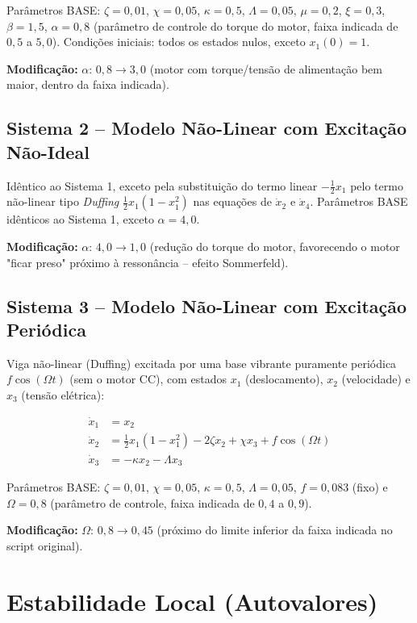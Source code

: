 \documentclass[a4paper,11pt]{article}
\begin{document}
Parâmetros BASE: $\zeta=0{,}01$, $\chi=0{,}05$, $\kappa=0{,}5$,
$\Lambda=0{,}05$, $\mu=0{,}2$, $\xi=0{,}3$, $\beta=1{,}5$,
$\alpha=0{,}8$ (parâmetro de controle do torque do motor, faixa
indicada de $0{,}5$ a $5{,}0$). Condições iniciais: todos os estados
nulos, exceto $x_1(0)=1$.

\textbf{Modificação:} $\alpha:\,0{,}8 \rightarrow 3{,}0$ (motor com
torque/tensão de alimentação bem maior, dentro da faixa indicada).

\subsection{Sistema 2 -- Modelo Não-Linear com Excitação Não-Ideal}
Idêntico ao Sistema 1, exceto pela substituição do termo linear
$-\tfrac{1}{2}x_1$ pelo termo não-linear tipo \emph{Duffing}
$\tfrac{1}{2}x_1(1-x_1^2)$ nas equações de $\dot x_2$ e $\dot x_4$.
Parâmetros BASE idênticos ao Sistema 1, exceto $\alpha=4{,}0$.

\textbf{Modificação:} $\alpha:\,4{,}0 \rightarrow 1{,}0$ (redução do
torque do motor, favorecendo o motor "ficar preso" próximo à
ressonância -- efeito Sommerfeld).

\subsection{Sistema 3 -- Modelo Não-Linear com Excitação Periódica}
Viga não-linear (Duffing) excitada por uma base vibrante puramente
periódica $f\cos(\Omega t)$ (sem o motor CC), com estados $x_1$
(deslocamento), $x_2$ (velocidade) e $x_3$ (tensão elétrica):

\begin{align}
\dot{x}_1 &= x_2 \\
\dot{x}_2 &= \frac{1}{2}x_1(1-x_1^2) - 2\zeta x_2 + \chi x_3 + f\cos(\Omega t) \\
\dot{x}_3 &= -\kappa x_2 - \Lambda x_3
\end{align}

Parâmetros BASE: $\zeta=0{,}01$, $\chi=0{,}05$, $\kappa=0{,}5$,
$\Lambda=0{,}05$, $f=0{,}083$ (fixo) e $\Omega=0{,}8$ (parâmetro de
controle, faixa indicada de $0{,}4$ a $0{,}9$).

\textbf{Modificação:} $\Omega:\,0{,}8 \rightarrow 0{,}45$ (próximo do
limite inferior da faixa indicada no script original).

\section{Estabilidade Local (Autovalores)}
\end{document}

